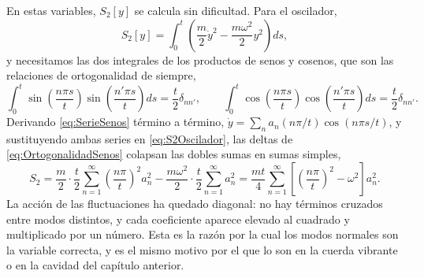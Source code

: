         En estas variables, $S_{2}[y]$ se calcula sin dificultad. Para el oscilador,
        \begin{equation}\label{eq:S2Oscilador}
            S_{2}[y] = \int_{0}^{t}\left(\frac{m}{2}\dot{y}^{2} - \frac{m\omega^{2}}{2}y^{2}\right)ds,
        \end{equation}
        y necesitamos las dos integrales de los productos de senos y cosenos, que son las relaciones de ortogonalidad de siempre,
        \begin{equation}\label{eq:OrtogonalidadSenos}
            \int_{0}^{t}\sin\left(\frac{n\pi s}{t}\right)\sin\left(\frac{n'\pi s}{t}\right)ds = \frac{t}{2}\delta_{nn'},
            \qquad
            \int_{0}^{t}\cos\left(\frac{n\pi s}{t}\right)\cos\left(\frac{n'\pi s}{t}\right)ds = \frac{t}{2}\delta_{nn'} .
        \end{equation}
        Derivando \eqref{eq:SerieSenos} término a término, $\dot{y} = \sum_{n} a_{n}(n\pi/t)\cos(n\pi s/t)$, y sustituyendo ambas series en \eqref{eq:S2Oscilador}, las deltas de \eqref{eq:OrtogonalidadSenos} colapsan las dobles sumas en sumas simples,
        \begin{equation}\label{eq:S2Diagonal}
            S_{2} = \frac{m}{2}\cdot\frac{t}{2}\sum_{n=1}^{\infty}\left(\frac{n\pi}{t}\right)^{2}a_{n}^{2} - \frac{m\omega^{2}}{2}\cdot\frac{t}{2}\sum_{n=1}^{\infty}a_{n}^{2}
            = \frac{mt}{4}\sum_{n=1}^{\infty}\left[\left(\frac{n\pi}{t}\right)^{2}-\omega^{2}\right]a_{n}^{2} .
        \end{equation}
        La acción de las fluctuaciones ha quedado diagonal: no hay términos cruzados entre modos distintos, y cada coeficiente aparece elevado al cuadrado y multiplicado por un número. Esta es la razón por la cual los modos normales son la variable correcta, y es el mismo motivo por el que lo son en la cuerda vibrante o en la cavidad del capítulo anterior.

